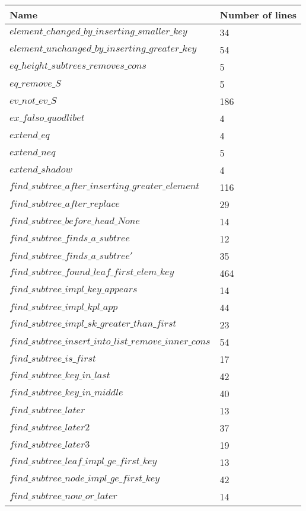 \begin{tabular}{| l | l |}
\hline
Name & Number of lines \\ \hline
$element\_changed\_by\_inserting\_smaller\_key$ & 34 \\ \hline
$element\_unchanged\_by\_inserting\_greater\_key$ & 54 \\ \hline
$eq\_height\_subtrees\_removes\_cons$ & 5 \\ \hline
$eq\_remove\_S$ & 5 \\ \hline
$ev\_not\_ev\_S$ & 186 \\ \hline
$ex\_falso\_quodlibet$ & 4 \\ \hline
$extend\_eq$ & 4 \\ \hline
$extend\_neq$ & 5 \\ \hline
$extend\_shadow$ & 4 \\ \hline
$find\_subtree\_after\_inserting\_greater\_element$ & 116 \\ \hline
$find\_subtree\_after\_replace$ & 29 \\ \hline
$find\_subtree\_before\_head\_None$ & 14 \\ \hline
$find\_subtree\_finds\_a\_subtree$ & 12 \\ \hline
$find\_subtree\_finds\_a\_subtree'$ & 35 \\ \hline
$find\_subtree\_found\_leaf\_first\_elem\_key$ & 464 \\ \hline
$find\_subtree\_impl\_key\_appears$ & 14 \\ \hline
$find\_subtree\_impl\_kpl\_app$ & 44 \\ \hline
$find\_subtree\_impl\_sk\_greater\_than\_first$ & 23 \\ \hline
$find\_subtree\_insert\_into\_list\_remove\_inner\_cons$ & 54 \\ \hline
$find\_subtree\_is\_first$ & 17 \\ \hline
$find\_subtree\_key\_in\_last$ & 42 \\ \hline
$find\_subtree\_key\_in\_middle$ & 40 \\ \hline
$find\_subtree\_later$ & 13 \\ \hline
$find\_subtree\_later2$ & 37 \\ \hline
$find\_subtree\_later3$ & 19 \\ \hline
$find\_subtree\_leaf\_impl\_ge\_first\_key$ & 13 \\ \hline
$find\_subtree\_node\_impl\_ge\_first\_key$ & 42 \\ \hline
$find\_subtree\_now\_or\_later$ & 14 \\ \hline

\end{tabular}

